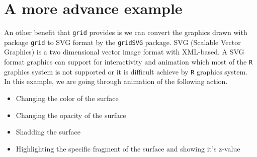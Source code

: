 \documentclass[paper=a4, fontsize=11pt]{report}
\begin{document}
\newpage
\section{A more advance example}
An other benefit that \texttt{grid} provides is we can convert the graphics drawn with package \texttt{grid} to SVG format by the \texttt{gridSVG} package.
SVG (Scalable Vector Graphics) is a two dimensional vector image format with XML-based. A SVG format graphics can support for interactivity and animation which most of the \texttt{R} graphics system is not supported or it is difficult achieve by \texttt{R} graphics system.\\

In this example, we are going through animation of the following action.
\begin{itemize}
  \item Changing the color of the surface
  \item Changing the opacity of the surface
  \item Shadding the surface
  \item Highlighting the specific fragment of the surface and showing it's z-value  
\end{itemize}
\end{document}
